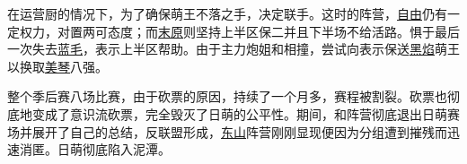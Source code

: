 在运营厨的情况下，为了确保萌王不落之手，决定联手。这时的阵营，\uline{自由}仍有一定权力，对置两可态度；而\uline{末原}则坚持上半区保二并且下半场不给活路。惧于最后一次失去\uline{蓝毛}，表示上半区帮助。由于主力炮姐和相撞，尝试向表示保送\uline{黑焰}萌王以换取\uline{美琴}八强。

整个季后赛八场比赛，由于砍票的原因，持续了一个月多，赛程被割裂。砍票也彻底地变成了意识流砍票，完全毁灭了日萌的公平性。期间，和阵营彻底退出日萌赛场并展开了自己的总结，反联盟形成，\uline{东山}阵营刚刚显现便因为分组遭到摧残而迅速消匿。日萌彻底陷入泥潭。

\newpage

